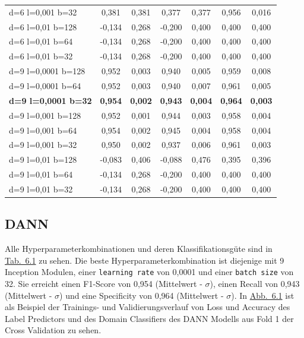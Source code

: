 \begin{table}[h!]
\begin{tabular}{lcccccc}
d=6 l=0,001 b=32  & 0,381  & 0,381  & 0,377  & 0,377 & 0,956 & 0,016 \\
d=6 l=0,01 b=128  & -0,134  & 0,268  & -0,200  & 0,400 & 0,400 & 0,400 \\
d=6 l=0,01 b=64  & -0,134  & 0,268  & -0,200  & 0,400 & 0,400 & 0,400 \\
d=6 l=0,01 b=32  & -0,134  & 0,268  & -0,200  & 0,400 & 0,400 & 0,400 \\
d=9 l=0,0001 b=128  & 0,952  & 0,003  & 0,940  & 0,005 & 0,959 & 0,008 \\
d=9 l=0,0001 b=64  & 0,952  & 0,003  & 0,940  & 0,007 & 0,961 & 0,005 \\
\textbf{d=9 l=0,0001 b=32}  & \textbf{0,954}  & \textbf{0,002}  & \textbf{0,943}  & \textbf{0,004} & \textbf{0,964} & \textbf{0,003} \\
d=9 l=0,001 b=128  & 0,952  & 0,001  & 0,944  & 0,003 & 0,958 & 0,004 \\
d=9 l=0,001 b=64  & 0,954  & 0,002  & 0,945  & 0,004 & 0,958 & 0,004 \\
d=9 l=0,001 b=32  & 0,950  & 0,002  & 0,937  & 0,006 & 0,961 & 0,003 \\
d=9 l=0,01 b=128  & -0,083  & 0,406  & -0,088  & 0,476 & 0,395 & 0,396 \\
d=9 l=0,01 b=64  & -0,134  & 0,268  & -0,200  & 0,400 & 0,400 & 0,400 \\
d=9 l=0,01 b=32  & -0,134  & 0,268  & -0,200  & 0,400 & 0,400 & 0,400 \\

\bottomrule
\end{tabular}
\end{table}

\subsection*{DANN}

Alle Hyperparameterkombinationen und deren Klassifikationsgüte sind in \hyperref[tab:GridSearch_DANN]{Tab.~6.1} zu sehen. Die beste Hyperparameterkombination ist diejenige mit 9 Inception Modulen, einer \texttt{learning rate} von 0,0001 und einer \texttt{batch size} von 32. Sie erreicht einen F1-Score von 0,954 (Mittelwert - $\sigma$), einen Recall von 0,943 (Mittelwert - $\sigma$) und eine Specificity von 0,964 (Mittelwert - $\sigma$).
In \hyperref[fig:DANN_training]{Abb.~6.1} ist als Beispiel der Trainings- und Validierungsverlauf von Loss und Accuracy des Label Predictors und des Domain Classifiers des \gls{DANN} Modells aus Fold 1 der Cross Validation zu sehen. 

